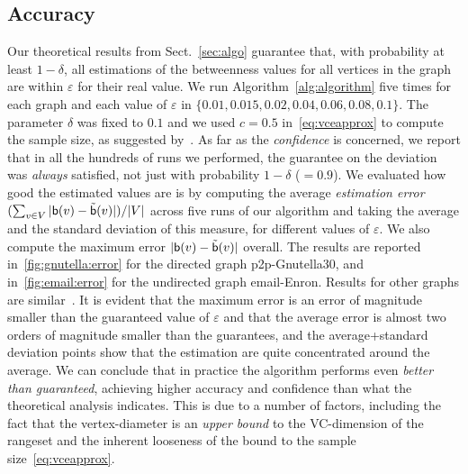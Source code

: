 \subsection{Accuracy}\label{sec:accuracy}
Our theoretical results from Sect.~\ref{sec:algo} guarantee that, with probability
at least $1-\delta$, all estimations of the betweenness values for all vertices
in the graph are within $\varepsilon$ for their real value. %
We run Algorithm~\ref{alg:algorithm} five times for each graph and each value of
$\varepsilon$ in $\{0.01, 0.015, 0.02, 0.04, 0.06, 0.08, 0.1\}$. The parameter
$\delta$ was fixed to $0.1$ and we used $c=0.5$ in~\eqref{eq:vceapprox} to
compute the sample size, as suggested by~\citet{LofflerP09}. As far as the
\emph{confidence} is concerned, we report that in all the hundreds of runs we
performed, the guarantee on the deviation was \emph{always} satisfied, not just
with probability $1-\delta$ ($=0.9$). We evaluated how good the estimated values
are is by computing the average \emph{estimation error} $(\sum_{v\in
V}|\mathsf{b}(v)-\tilde{\mathsf{b}}(v)|)/|V|$ across five runs of our algorithm and taking
the average and the standard deviation of this measure, for different values of
$\varepsilon$. We also compute the maximum error $|\mathsf{b}(v)-\tilde{\mathsf{b}}(v)|$
overall. The results are reported in~\cref{fig:gnutella:error} for the directed
graph p2p-Gnutella30, and in~\cref{fig:email:error} for the undirected graph
email-Enron. Results for other graphs are similar~\citep{Anonymous13}. It is
evident that the maximum error is an error of magnitude smaller than the
guaranteed value of $\varepsilon$ and that the average error is almost two
orders of magnitude smaller than the guarantees, and the average+standard
deviation points show that the estimation are quite concentrated around the
average. We can conclude that in practice the algorithm performs even \emph{better
than guaranteed}, achieving higher accuracy and confidence than what the
theoretical analysis indicates. This is due to a number of factors, including
the fact that the vertex-diameter is an \emph{upper bound} to the VC-dimension
of the rangeset and the inherent looseness of the bound to the
sample size~\eqref{eq:vceapprox}.

